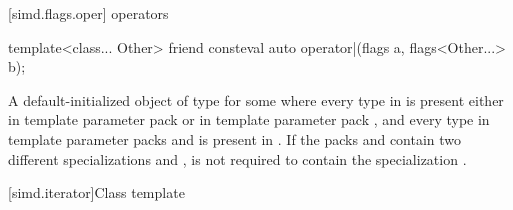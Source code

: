 [simd.flags.oper]{ operators}

\begin{itemdecl}
template<class... Other>
  friend consteval auto operator|(flags a, flags<Other...> b);
\end{itemdecl}

\begin{itemdescr}
\pnum
\returns
  A default-initialized object of type  for some
   where every type in  is present either in template parameter pack
   or in template parameter pack , and every type in template parameter
  packs  and  is present in .
  If the packs  and  contain two
  different specializations  and
  ,  is not required to contain the
  specialization .
\end{itemdescr}

[simd.iterator]{Class template }

